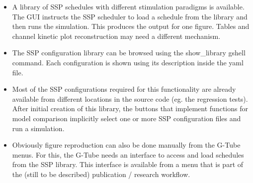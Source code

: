 \documentclass[12pt]{article}
\begin{document}
\begin{itemize}
\item A library of SSP schedules with different stimulation paradigms
  is available.  The GUI instructs the SSP scheduler to load a
  schedule from the library and then runs the simulation.  This
  produces the output for one figure.  Tables and channel kinetic plot
  reconstruction may need a different mechanism.
\item The SSP configuration library can be browsed using the
  show\_library gshell command.  Each configuration is shown using its
  description inside the yaml file.
\item Most of the SSP configurations required for this functionality
  are already available from different locations in the source code
  (eg. the regression tests).  After initial creation of this library,
  the buttons that implement functions for model comparison implicitly
  select one or more SSP configuration files and run a simulation.
\item Obviously figure reproduction can also be done manually from the
  G-Tube menus.  For this, the G-Tube needs an interface to access and
  load schedules from the SSP library.  This interface is available
  from a menu that is part of the (still to be described) publication
  / research workflow.
\end{itemize}




\end{document}
